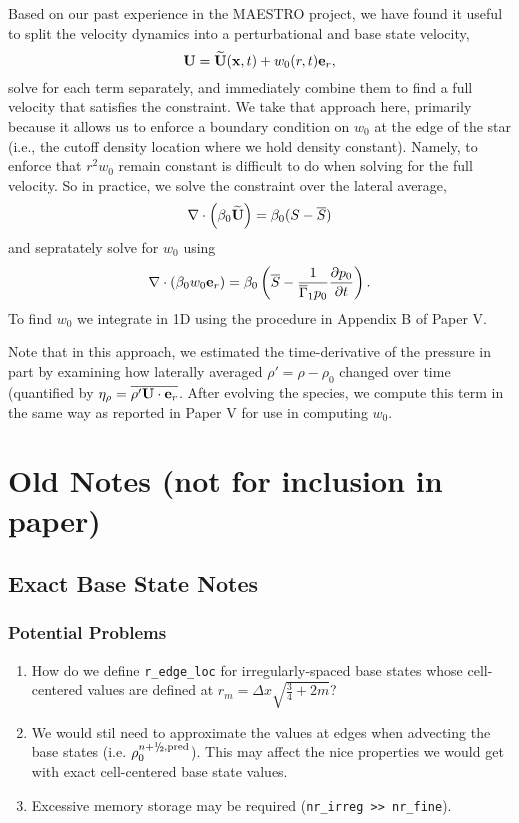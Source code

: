 \documentclass{aastex62}
\newcommand{\sfrac}[2]{\mathchoice
  {\kern0em\raise.5ex\hbox{\the\scriptfont0 #1}\kern-.15em/
   \kern-.15em\lower.25ex\hbox{\the\scriptfont0 #2}}
  {\kern0em\raise.5ex\hbox{\the\scriptfont0 #1}\kern-.15em/
   \kern-.15em\lower.25ex\hbox{\the\scriptfont0 #2}}
  {\kern0em\raise.5ex\hbox{\the\scriptscriptfont0 #1}\kern-.2em/
   \kern-.15em\lower.25ex\hbox{\the\scriptscriptfont0 #2}}
  {#1\!/#2}}
\newcommand{\myhalf}{\sfrac{1}{2}}
\newcommand{\eb}{{\bf{e}}}
\newcommand{\Ub}{{\bf{U}}}
\newcommand{\Ubt}{\widetilde{\Ub}}
\newcommand{\xb}{{\bf{x}}}
\newcommand{\gammaonebar}{\overline{\Gamma}_1}
\newcommand{\pred}{{\rm pred}}
\newcommand{\nph}{{n+\myhalf}}
\begin{document}
Based on our past experience in the MAESTRO project, we have found it useful to split the velocity dynamics into a perturbational and base state velocity,
\begin{equation}
\Ub = \Ubt(\xb,t) + w_0(r,t)\eb_r,
\end{equation}
solve for each term separately, and immediately combine them to find a full velocity that satisfies the constraint.  We take that approach here, primarily because it allows us to enforce a boundary condition on $w_0$ at the edge of the star (i.e., the cutoff density location where we hold density constant).  Namely, to enforce that $r^2 w_0$ remain constant is difficult to do when solving for the full velocity.  So in practice, we solve the constraint over the lateral average,
\begin{equation}
\nabla\cdot\left(\beta_0\Ubt\right) = \beta_0(S-\overline{S})
\end{equation}
and sepratately solve for $w_0$ using 
\begin{equation}
\nabla\cdot(\beta_0w_0\eb_r) = \beta_0\left(\overline{S} - \frac{1}{\gammaonebar p_0}\frac{\partial p_0}{\partial t}\right).
\end{equation}
To find $w_0$ we integrate in 1D using the procedure in Appendix B of Paper V.

Note that in this approach, we estimated the time-derivative of the pressure in part by examining how laterally averaged $\rho'=\rho-\rho_0$ changed over time (quantified by $\eta_\rho = \overline{\rho'\Ub\cdot\eb_r}$.  After evolving the species, we compute this term in the same way as reported in Paper V for use in computing $w_0$.

\section{Old Notes (not for inclusion in paper)}

\subsection{Exact Base State Notes}

\subsubsection{Potential Problems}
\begin{enumerate}
\item How do we define \verb|r_edge_loc| for irregularly-spaced base states whose cell-centered values are defined at $r_m=\Delta x\sqrt{\frac{3}{4} + 2m}$?
\item We would stil need to approximate the values at edges when advecting the base states (i.e. $\rho_0^{\nph,\pred}$). This may affect the nice properties we would get with exact cell-centered base state values.
\item Excessive memory storage may be required (\verb|nr_irreg >> nr_fine|).
\end{enumerate}
\end{document}

